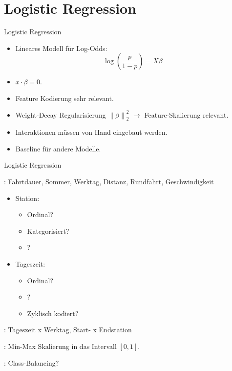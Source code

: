 \section{Logistic Regression}

\begin{frame}{Logistic Regression}
{
\begin{itemize}
\item Lineares Modell für Log-Odds:
\begin{equation}
\log(\frac{p}{1-p}) = X\beta
\end{equation}
\item {} $x \cdot \beta = 0$.
\item Feature Kodierung sehr relevant.
\item Weight-Decay Regularisierung $\left\lVert\beta\right\rVert_2^2$ $\rightarrow$ Feature-Skalierung relevant.
\item Interaktionen müssen von Hand eingebaut werden.
\item Baseline für andere Modelle.
\end{itemize}
}
\end{frame}

\begin{frame}{Logistic Regression}
{
: Fahrtdauer, Sommer, Werktag, Distanz, Rundfahrt, Geschwindigkeit
\vspace{-0.4cm}
\begin{multicols}{2}
\begin{itemize}
\item Station:
\begin{itemize}
\item Ordinal?
\item Kategorisiert?
\item {}?
\end{itemize}
\item Tageszeit:
\begin{itemize}
\item Ordinal?
\item {}?
\item Zyklisch kodiert?
\end{itemize}
\end{itemize}
\end{multicols}

: Tageszeit x Werktag, Start- x Endstation

: Min-Max Skalierung in das Intervall $[0,1]$.

: Class-Balancing?
}
\end{frame}

